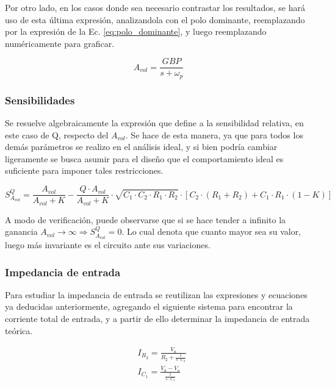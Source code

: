 Por otro lado, en los casos donde sea necesario contrastar los resultados, se har\'a uso de esta \'ultima expresi\'on, analizandola con el polo dominante,
reemplazando por la expresi\'on de la Ec. \ref{eq:polo_dominante}, y luego reemplazando num\'ericamente para graficar.

\begin{equation}
    A_{vol} = \frac{GBP}{s + \omega_p}
    \label{eq:polo_dominante}
\end{equation}

\subsubsection{Sensibilidades}
Se resuelve algebraicamente la expresi\'on que define a la sensibilidad relativa, en este caso de Q, respecto del $A_{vol}$. Se hace de esta manera, ya que para todos los dem\'as par\'ametros
se realizo en el an\'alisis ideal, y si bien podr\'ia cambiar ligeramente se busca asumir para el dise\~no que el comportamiento ideal es suficiente para imponer tales restricciones.

\begin{equation}
    S^{Q}_{A_{vol}} = \frac{A_{vol}}{A_{vol} + K}
    - \frac{Q \cdot A_{vol}}{A_{vol} + K} \cdot \sqrt{C_1 \cdot C_2 \cdot R_1 \cdot R_2}
    \cdot \left[ C_2 \cdot (R_1 + R_2) + C_1 \cdot R_1 \cdot (1 - K) \right]
\end{equation}

A modo de verificaci\'on, puede observarse que si se hace tender a infinito la ganancia $A_{vol} \rightarrow \infty \Rightarrow S^{Q}_{A_{vol}} = 0$.
Lo cual denota que cuanto mayor sea su valor, luego m\'as invariante es el circuito ante sus variaciones.

\subsubsection{Impedancia de entrada}
Para estudiar la impedancia de entrada se reutilizan las expresiones y ecuaciones ya deducidas anteriormente, agregando
el siguiente sistema para encontrar la corriente total de entrada, y a partir de ello determinar la impedancia de entrada te\'orica.

\begin{align*}
    & I_{R_2} = \frac{V_a}{R_2 + \frac{1}{s \cdot C_2}} \\
    & I_{C_1} = \frac{V_a - V_o}{\frac{1}{s \cdot C_1}}
\end{align*}

